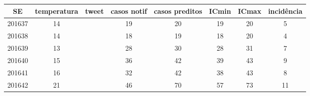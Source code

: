 \begin{tabular}{c|ccccccc}
  \hline
SE & temperatura & tweet & casos notif & casos preditos & ICmin & ICmax & incidência \\ 
  \hline
201637 & 14 &  & 19 & 20 & 19 & 20 & 5 \\ 
  201638 & 14 &  & 18 & 19 & 18 & 20 & 4 \\ 
  201639 & 13 &  & 28 & 30 & 28 & 31 & 7 \\ 
  201640 & 15 &  & 36 & 42 & 39 & 43 & 9 \\ 
  201641 & 16 &  & 32 & 42 & 38 & 43 & 8 \\ 
  201642 & 21 &  & 46 & 70 & 57 & 73 & 11 \\ 
   \hline
\end{tabular}
